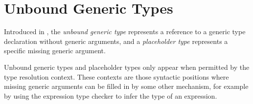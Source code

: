 \documentclass[../generics]{subfiles}
\begin{document}
\section{Unbound Generic Types}\label{unbound generic types}

Introduced in , the \emph{unbound generic type} represents a reference to a generic type declaration without generic arguments, and a \emph{placeholder type} represents a specific missing generic argument.

Unbound generic types and placeholder types only appear when permitted by the type resolution context. These contexts are those syntactic positions where missing generic arguments can be filled in by some other mechanism, for example by using the expression type checker to infer the type of an expression.
\end{document}
